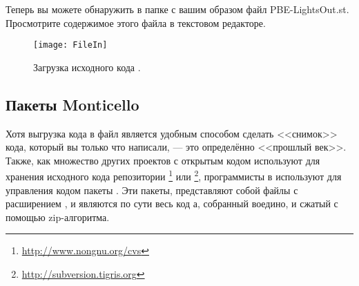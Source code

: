 \documentclass[a4paper,10pt,twoside]{book}
\begin{document}
Теперь вы можете обнаружить в папке с вашим образом файл PBE-LightsOut.st.
Просмотрите содержимое этого файла в текстовом редакторе.

\dothis{Откройте свежий образ \pharo и с помощью браузера файлов (File Browser) (пункт меню \menu{Tools \ldots {\go} File Browser}) загрузите (пункт меню \menu{file in}) файл PBE-LightsOut.st.
Проверьте, что игра продолжает работать и в новом образе.}

\begin{figure}[ht]
\centerline {\texttt{[image: FileIn]}}
\caption{Загрузка исходного кода \pharo.
}
\end{figure}

\subsection{Пакеты Monticello}
Хотя выгрузка кода в файл является удобным способом сделать <<снимок>> кода, который вы только что написали, --- это определённо <<прошлый век>>.
Также, как множество других проектов с открытым кодом используют для хранения исходного кода репозитории \footnote{\url{http://www.nongnu.org/cvs}} или \footnote{\url{http://subversion.tigris.org}},
программисты в \pharo используют для управления кодом пакеты .
Эти пакеты, представляют собой файлы с расширением , и являются по сути весь код а, собранный воедино, и сжатый с помощью zip-алгоритма.
\end{document}
